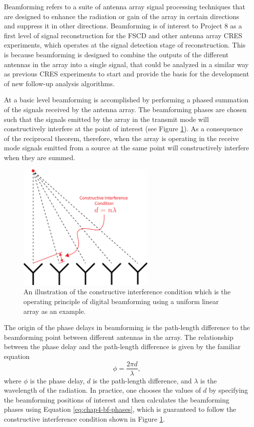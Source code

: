Beamforming refers to a suite of antenna array signal processing techniques that are designed to enhance the radiation or gain of the array in certain directions and suppress it in other directions. Beamforming is of interest to Project 8 as a first level of signal reconstruction for the FSCD and other antenna array CRES experiments, which operates at the signal detection stage of reconstruction. This is because beamforming is designed to combine the outputs of the different antennas in the array into a single signal, that could be analyzed in a similar way as previous CRES experiments to start and provide the basis for the development of new follow-up analysis algorithms.

At a basic level beamforming is accomplished by performing a phased summation of the signals received by the antenna array. The beamforming phases are chosen such that the signals emitted by the array in the transmit mode will constructively interfere at the point of interest (see Figure \ref{fig:chap4-basic-bf}). As a consequence of the reciprocal theorem, therefore, when the array is operating in the receive mode signals emitted from a source at the same point will constructively interfere when they are summed.  
\begin{figure}[htbp]
    \centering
    \includegraphics[width=0.6\textwidth]{figs/Chapter-4/230517_basic_bf.png}
    \caption{An illustration of the constructive interference condition which is the operating principle of digital beamforming using a uniform linear array as an example.}
    \label{fig:chap4-basic-bf}
\end{figure}
The origin of the phase delays in beamforming is the path-length difference to the beamforming point between different antennas in the array. The relationship between the phase delay and the path-length difference is given by the familiar equation
\begin{equation}
    \phi=\frac{2\pi d}{\lambda},
    \label{eq:chap4-bf-phases}
\end{equation}
where $\phi$ is the phase delay, $d$ is the path-length difference, and $\lambda$ is the wavelength of the radiation. In practice, one chooses the values of $d$ by specifying the beamforming positions of interest and then calculates the beamforming phases using Equation \ref{eq:chap4-bf-phases}, which is guaranteed to follow the constructive interference condition shown in Figure \ref{fig:chap4-basic-bf}. 

